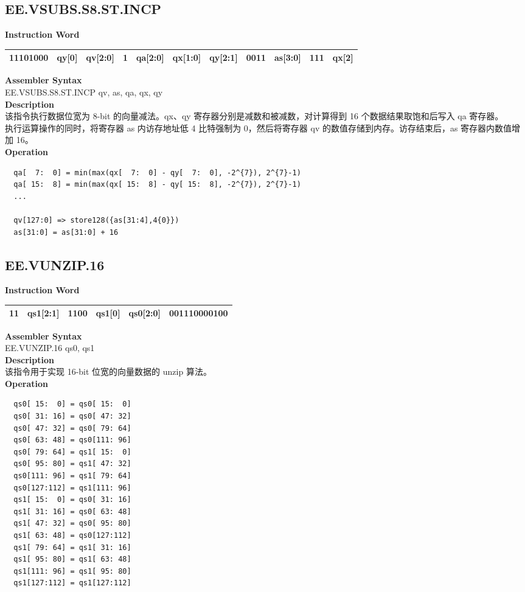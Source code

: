 \clearpage
\subsection{EE.VSUBS.S8.ST.INCP}\label{instruction:EEVSUBSS8STINCP}
\setlength\tabcolsep{6pt}
\textbf{Instruction Word} \\
\begin{tabular}{|c|c|c|c|c|c|c|c|c|c|c|}
	\hline
	11101000 & qy[0] & qv[2:0] & 1 & qa[2:0] & qx[1:0] & qy[2:1] & 0011 & as[3:0] & 111 & qx[2] \\
	\hline
\end{tabular}

\textbf{Assembler Syntax} \\
EE.VSUBS.S8.ST.INCP qv, as, qa, qx, qy \\
\textbf{Description} \\
该指令执行数据位宽为 8-bit 的向量减法。qx、qy 寄存器分别是减数和被减数，对计算得到 16 个数据结果取饱和后写入 qa 寄存器。\\ 执行运算操作的同时，将寄存器 as 内访存地址低 4 比特强制为 0，然后将寄存器 qv 的数值存储到内存。访存结束后，as 寄存器内数值增加 16。\\
\textbf{Operation}
\begin{lstlisting}
  qa[  7:  0] = min(max(qx[  7:  0] - qy[  7:  0], -2^{7}), 2^{7}-1)
  qa[ 15:  8] = min(max(qx[ 15:  8] - qy[ 15:  8], -2^{7}), 2^{7}-1)
  ...

  qv[127:0] => store128({as[31:4],4{0}})
  as[31:0] = as[31:0] + 16
\end{lstlisting}

\clearpage
\subsection{EE.VUNZIP.16}\label{instruction:EEVUNZIP16}
\setlength\tabcolsep{6pt}
\textbf{Instruction Word} \\
\begin{tabular}{|c|c|c|c|c|c|}
	\hline
	11 & qs1[2:1] & 1100 & qs1[0] & qs0[2:0] & 001110000100 \\
	\hline
\end{tabular}

\textbf{Assembler Syntax} \\
EE.VUNZIP.16 qs0, qs1 \\
\textbf{Description} \\
该指令用于实现 16-bit 位宽的向量数据的 unzip 算法。\\
\textbf{Operation}
\begin{lstlisting}
  qs0[ 15:  0] = qs0[ 15:  0]
  qs0[ 31: 16] = qs0[ 47: 32]
  qs0[ 47: 32] = qs0[ 79: 64]
  qs0[ 63: 48] = qs0[111: 96]
  qs0[ 79: 64] = qs1[ 15:  0]
  qs0[ 95: 80] = qs1[ 47: 32]
  qs0[111: 96] = qs1[ 79: 64]
  qs0[127:112] = qs1[111: 96]
  qs1[ 15:  0] = qs0[ 31: 16]
  qs1[ 31: 16] = qs0[ 63: 48]
  qs1[ 47: 32] = qs0[ 95: 80]
  qs1[ 63: 48] = qs0[127:112]
  qs1[ 79: 64] = qs1[ 31: 16]
  qs1[ 95: 80] = qs1[ 63: 48]
  qs1[111: 96] = qs1[ 95: 80]
  qs1[127:112] = qs1[127:112]
\end{lstlisting}

